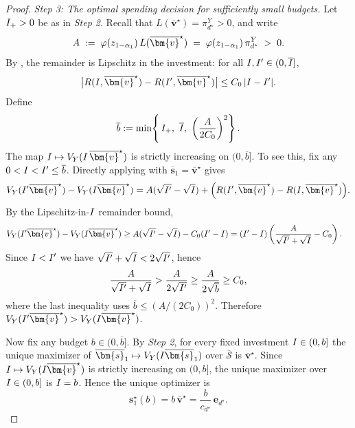 \begin{proof}
  \emph{Step 3: The optimal spending decision for sufficiently small budgets.}
  Let $I_+>0$ be as in \emph{Step 2}.
  Recall that $L(\overline{\bm{v}}^\star)=\pi_{d^\star}^Y>0$, and write
  \[
    A \;\defeq\; \varphi(z_{1-\alpha_1})\,L(\overline{\bm{v}}^\star)
    \;=\;\varphi(z_{1-\alpha_1})\,\pi_{d^\star}^Y \;>\;0.
  \]
  By , the remainder is Lipschitz in the investment: for all $I,I'\in(0,\overline{I}]$,
  \[
    \big|R(\invst,\overline{\bm{v}}^\star)-R(\invst',\overline{\bm{v}}^\star)\big|
    \le C_0\,|\invst-\invst'|.
  \]
  Define
  \[
    \overline{b} \defeq
    \min\!\left\{\,\invst_+,\ \overline{\invst},\ \left(\frac{A}{2C_0}\right)^2\right\}.
  \]
  The map $\invst\mapsto V_Y(\invst\,\overline{\bm{v}}^\star)$ is strictly increasing on $(0,\overline{b}]$.
  To see this, fix any $0<I<I'\le \overline{b}$.
  Directly applying  with $\overline{\bm{s}}_1=\overline{\bm{v}}^\star$ gives
  \[
    V_Y(\invst'\overline{\bm{v}}^\star)-V_Y(\invst\overline{\bm{v}}^\star)
    =
    A(\sqrt{\invst'}-\sqrt{\invst})
    +\Big(R(\invst',\overline{\bm{v}}^\star)-R(\invst,\overline{\bm{v}}^\star)\Big).
  \]
  By the Lipschitz-in-$I$ remainder bound,
  \begin{align*}
    V_Y(\invst'\overline{\bm{v}}^\star)-V_Y(\invst\overline{\bm{v}}^\star)
    &\ge
    A(\sqrt{\invst'}-\sqrt{\invst}) - C_0(\invst'-\invst)
    = (\invst'-\invst)\left(\frac{A}{\sqrt{\invst'}+\sqrt{\invst}}-C_0\right).
  \end{align*}
  Since $I<I'$ we have $\sqrt{I'}+\sqrt{I}<2\sqrt{I'}$, hence
  \[
    \frac{A}{\sqrt{I'}+\sqrt{I}}
    >
    \frac{A}{2\sqrt{I'}}
    \ge
    \frac{A}{2\sqrt{\overline{b}}}
    \ge C_0,
  \]
  where the last inequality uses $\overline{b}\le (A/(2C_0))^2$.
  Therefore $V_Y(\invst'\overline{\bm{v}}^\star)>V_Y(\invst\overline{\bm{v}}^\star)$.

  Now fix any budget $b\in(0,\overline{b}]$.
  By \emph{Step 2}, for every fixed investment $I\in(0,b]$ the unique maximizer of $\overline{\bm{s}}_1\mapsto V_Y(\invst\overline{\bm{s}}_1)$ over $\overline{\mathcal{S}}$ is $\overline{\bm{v}}^\star$.
  Since $\invst\mapsto V_Y(\invst\overline{\bm{v}}^\star)$ is strictly increasing on $(0,b]$, the unique maximizer over $I\in(0,b]$ is $I=b$.
  Hence the unique optimizer is
  \[
    \bm{s}_1^\star(b)=b\,\overline{\bm{v}}^\star
    =
    \frac{b}{c_{d^\star}}\,\bm{e}_{d^\star}.
  \]
\end{proof}

